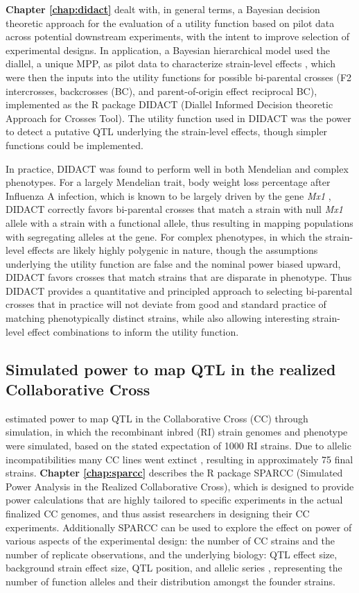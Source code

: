 \textbf{Chapter \ref{chap:didact}} dealt with, in general terms, a Bayesian decision theoretic approach for the evaluation of a utility function based on pilot data across potential downstream experiments, with the intent to improve selection of experimental designs. In application, a Bayesian hierarchical model used the diallel, a unique MPP, as pilot data to characterize strain-level effects \citep{Lenarcic2012}, which were then the inputs into the utility functions for possible bi-parental crosses (F2 intercrosses, backcrosses (BC), and parent-of-origin effect reciprocal BC), implemented as the R package DIDACT (Diallel Informed Decision theoretic Approach for Crosses Tool). The utility function used in DIDACT was the power to detect a putative QTL underlying the strain-level effects, though simpler functions could be implemented. 

In practice, DIDACT was found to perform well in both Mendelian and complex phenotypes. For a largely Mendelian trait, body weight loss percentage after Influenza A infection, which is known to be largely driven by the gene \textit{Mx1} \citep{Maurizio2017}, DIDACT correctly favors bi-parental crosses that match a strain with null \textit{Mx1} allele with a strain with a functional allele, thus resulting in mapping populations with segregating alleles at the gene. For complex phenotypes, in which the strain-level effects are likely highly polygenic in nature, though the assumptions underlying the utility function are false and the nominal power biased upward, DIDACT favors crosses that match strains that are disparate in phenotype. Thus DIDACT provides a quantitative and principled approach to selecting bi-parental crosses that in practice will not deviate from good and standard practice of matching phenotypically distinct strains, while also allowing interesting strain-level effect combinations to inform the utility function.

\subsection{Simulated power to map QTL in the realized Collaborative Cross}

\cite{Valdar2006c} estimated power to map QTL in the Collaborative Cross (CC) through simulation, in which the recombinant inbred (RI) strain genomes and phenotype were simulated, based on the stated expectation of 1000 RI strains. Due to allelic incompatibilities many CC lines went extinct \citep{Shorter2017}, resulting in approximately 75 final strains. \textbf{Chapter \ref{chap:sparcc}} describes the R package SPARCC (Simulated Power Analysis in the Realized Collaborative Cross), which is designed to provide power calculations that are highly tailored to specific experiments in the actual finalized CC genomes, and thus assist researchers in designing their CC experiments. Additionally SPARCC can be used to explore the effect on power of various aspects of the experimental design: the number of CC strains and the number of replicate observations, and the underlying biology: QTL effect size, background strain effect size, QTL position, and allelic series \citep{Yalcin2005}, representing the number of function alleles and their distribution amongst the founder strains.

